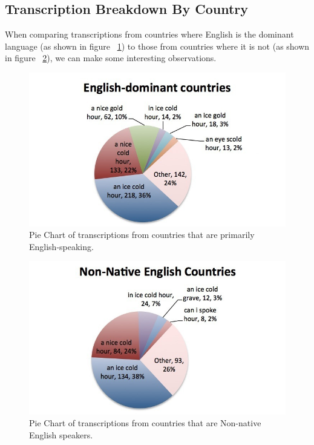 \subsection{Transcription Breakdown By Country}
\label{results:transcriptionsByCountry}


When comparing transcriptions from countries where English is the dominant language (as shown in figure ~\ref{fig:results:EnglishDominantPieChart}) to those from countries where it is not (as shown in figure ~\ref{fig:results:NonNativePieChart}), we can make some interesting observations.  

\begin{figure}
\includegraphics[width=\textwidth]{PieChart-EnglishDominantCountries-nobar.jpg}
\captionfonts
\caption[Pie Chart of transcriptions from countries that are primarily English-speaking]{ Pie Chart of transcriptions from countries that are primarily English-speaking.}
\label{fig:results:EnglishDominantPieChart}
\end{figure}

\begin{figure}
\includegraphics[width=\textwidth]{PieChart-NonNativeEnglishCountries-nobar.jpg}
\captionfonts
\caption[Pie Chart of transcriptions from countries that are Non-native English speakers]{ Pie Chart of transcriptions from countries that are Non-native English speakers.}
\label{fig:results:NonNativePieChart}
\end{figure}

